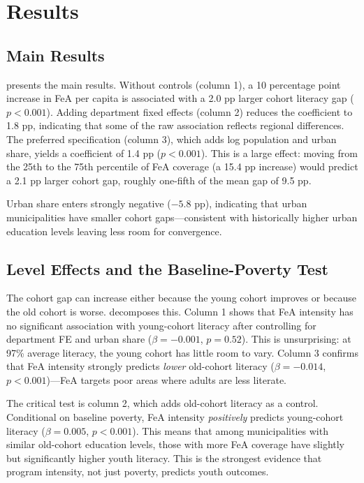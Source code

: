 \documentclass[12pt]{article}
\begin{document}
\section{Results}
\label{sec:results}

\subsection{Main Results}

{\small}

 presents the main results. Without controls (column 1), a 10 percentage point increase in FeA per capita is associated with a 2.0 pp larger cohort literacy gap ($p < 0.001$). Adding department fixed effects (column 2) reduces the coefficient to 1.8 pp, indicating that some of the raw association reflects regional differences. The preferred specification (column 3), which adds log population and urban share, yields a coefficient of 1.4 pp ($p < 0.001$). This is a large effect: moving from the 25th to the 75th percentile of FeA coverage (a 15.4 pp increase) would predict a 2.1 pp larger cohort gap, roughly one-fifth of the mean gap of 9.5 pp.

Urban share enters strongly negative ($-5.8$ pp), indicating that urban municipalities have smaller cohort gaps---consistent with historically higher urban education levels leaving less room for convergence.

\subsection{Level Effects and the Baseline-Poverty Test}

{\small}

The cohort gap can increase either because the young cohort improves or because the old cohort is worse.  decomposes this. Column 1 shows that FeA intensity has no significant association with young-cohort literacy after controlling for department FE and urban share ($\beta = -0.001$, $p = 0.52$). This is unsurprising: at 97\% average literacy, the young cohort has little room to vary. Column 3 confirms that FeA intensity strongly predicts \textit{lower} old-cohort literacy ($\beta = -0.014$, $p < 0.001$)---FeA targets poor areas where adults are less literate.

The critical test is column 2, which adds old-cohort literacy as a control. Conditional on baseline poverty, FeA intensity \textit{positively} predicts young-cohort literacy ($\beta = 0.005$, $p < 0.001$). This means that among municipalities with similar old-cohort education levels, those with more FeA coverage have slightly but significantly higher youth literacy. This is the strongest evidence that program intensity, not just poverty, predicts youth outcomes.
\end{document}
